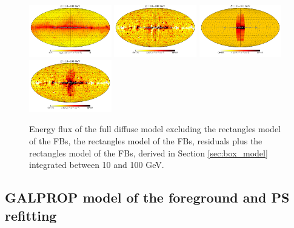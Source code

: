 \begin{figure}[h]
\centering
 \includegraphics[width=0.32\textwidth]{plots/Mollweide_Boxes_model_03-10GeV_flux_source_range_1_log.pdf}
\includegraphics[width=0.32\textwidth]{plots/Mollweide_Boxes_residual_03-10GeV_flux_source_range_1.pdf}
\includegraphics[width=0.32\textwidth]{plots/Mollweide_Boxes_03-10GeV_flux_source_range_1.pdf}
 \includegraphics[width=0.32\textwidth]{plots/Mollweide_Boxes_residual+boxes_03-10GeV_flux_source_range_1.pdf}
 \caption{Energy flux of the full diffuse model excluding the rectangles model of the FBs,
 the rectangles model of the FBs, 
 residuals plus the rectangles model of the FBs,
 derived in Section \ref{sec:box_model}
 integrated between 10 and 100 GeV.}
 \label{fig:Maps_Rectangles}
\end{figure}

\subsection{GALPROP model of the foreground and PS refitting}
\label{sec:galprop_model}


